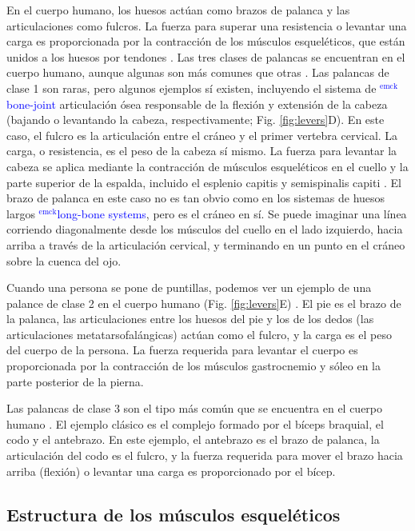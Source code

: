 \documentclass[12pt]{article}
\newcommand{\emck}[1]{\textcolor{blue}{$^{\textrm{emck}}${#1}}}
\begin{document}
En el cuerpo humano, los huesos actúan como brazos de palanca y las
articulaciones como fulcros. La fuerza para superar una resistencia o
levantar una carga es proporcionada por la contracción de los músculos
esqueléticos, que están unidos a los huesos por tendones
\cite{leversOLI,openStax2016lever}. Las tres clases de palancas se
encuentran en el cuerpo humano, aunque algunas son más comunes que
otras \cite{leversOLI}. Las palancas de clase 1 son raras, pero
algunos ejemplos sí existen, incluyendo el sistema de
\emck{bone-joint} articulación ósea responsable de la flexión y
extensión de la cabeza (bajando o levantando la cabeza,
respectivamente; Fig. \ref{fig:levers}D).  En este caso, el fulcro es
la articulación entre el cráneo y el primer vertebra cervical. La
carga, o resistencia, es el peso de la cabeza sí mismo. La fuerza para
levantar la cabeza se aplica mediante la contracción de músculos
esqueléticos en el cuello y la parte superior de la espalda, incluido
el esplenio capitis y semispinalis capiti \cite{openStax2016axial}.
El brazo de palanca en este caso no es tan obvio como en los sistemas
de huesos largos \emck{long-bone systems}, pero es el cráneo en sí. Se
puede imaginar una línea corriendo diagonalmente desde los músculos
del cuello en el lado izquierdo, hacia arriba a través de la articulación
cervical, y terminando en un punto en el cráneo sobre la cuenca del
ojo.

Cuando una persona se pone de puntillas, podemos ver un ejemplo de una
palance de clase 2 en el cuerpo humano (Fig. \ref{fig:levers}E)
\cite{leversOLI}. El pie es el brazo de la palanca, las articulaciones
entre los huesos del pie y los de los dedos (las articulaciones
metatarsofalángicas) actúan como el fulcro, y la carga es el peso del
cuerpo de la persona. La fuerza requerida para levantar el cuerpo es
proporcionada por la contracción de los músculos gastrocnemio y sóleo
en la parte posterior de la pierna.

Las palancas de clase 3 son el tipo más común que se encuentra en el
cuerpo humano \cite{leversOLI}. El ejemplo clásico es el complejo
formado por el bíceps braquial, el codo y el antebrazo. En este
ejemplo, el antebrazo es el brazo de palanca, la articulación del codo
es el fulcro, y la fuerza requerida para mover el brazo hacia arriba
(flexión) o levantar una carga es proporcionado por el bícep.


\subsection*{Estructura de los músculos esqueléticos}
\end{document}
